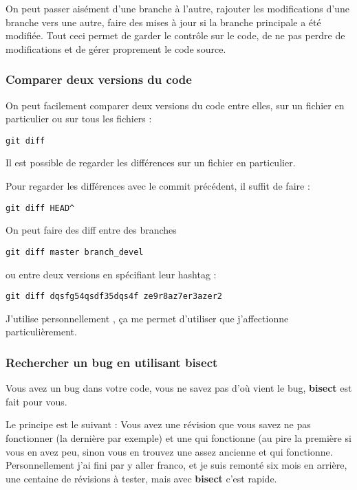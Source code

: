\bigskip

On peut passer aisément d'une branche à l'autre, rajouter les modifications d'une branche vers une autre, faire des mises à jour si la branche principale a été modifiée. Tout ceci permet de garder le contrôle sur le code, de ne pas perdre de modifications et de gérer proprement le code source. 

\subsubsection{Comparer deux versions du code}
On peut facilement comparer deux versions du code entre elles, sur un fichier en particulier ou sur tous les fichiers : 
\begin{verbatim}
git diff
\end{verbatim}

\begin{remarque}
Il est possible de regarder les différences sur un fichier en particulier.
\end{remarque}

Pour regarder les différences avec le commit précédent, il suffit de faire :
\begin{verbatim}
git diff HEAD^
\end{verbatim}

\bigskip

On peut faire des diff entre des branches 
\begin{verbatim}
git diff master branch_devel
\end{verbatim}
ou entre deux versions en spécifiant leur hashtag : 
\begin{verbatim}
git diff dqsfg54qsdf35dqs4f ze9r8az7er3azer2
\end{verbatim}

J'utilise personnellement , ça me permet d'utiliser  que j'affectionne particulièrement.

\subsubsection{Rechercher un bug en utilisant bisect}
Vous avez un bug dans votre code, vous ne savez pas d'où vient le bug, \textbf{bisect} est fait pour vous. 

Le principe est le suivant : Vous avez une révision que vous savez ne pas fonctionner (la dernière par exemple) et une qui fonctionne (au pire la première si vous en avez peu, sinon vous en trouvez une assez ancienne et qui fonctionne. Personnellement j'ai fini par y aller franco, et je suis remonté six mois en arrière, une centaine de révisions à tester, mais avec \textbf{bisect} c'est rapide. 

